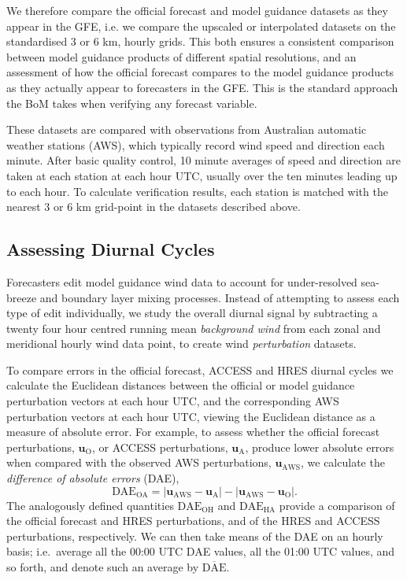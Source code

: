\documentclass[twocol]{ametsoc}
\begin{document}
We therefore compare the official forecast and model guidance datasets as they appear in the GFE, i.e. we compare the upscaled or interpolated datasets on the standardised 3 or 6 km, hourly grids. This both ensures a consistent comparison between model guidance products of different spatial resolutions, and an assessment of how the official forecast compares to the model guidance products as they actually appear to forecasters in the GFE. This is the standard approach the BoM takes when verifying any forecast variable.

These datasets are compared with observations from Australian automatic weather stations (AWS), which typically record wind speed and direction each minute. After basic quality control, 10 minute averages of speed and direction are taken at each station at each hour UTC, usually over the ten minutes leading up to each hour. To calculate verification results, each station is matched with the nearest 3 or 6 km grid-point in the datasets described above.

\subsection{Assessing Diurnal Cycles}
Forecasters edit model guidance wind data to account for under-resolved sea-breeze and boundary layer mixing processes. Instead of attempting to assess each type of edit individually, we study the overall diurnal signal by subtracting a twenty four hour centred running mean \textit{background wind} from each zonal and meridional hourly wind data point, to create wind \emph{perturbation} datasets.

To compare errors in the official forecast, ACCESS and HRES diurnal cycles we calculate the Euclidean distances between the official or model guidance perturbation vectors at each hour UTC, and the corresponding AWS perturbation vectors at each hour UTC, viewing the Euclidean distance as a measure of absolute error. For example, to assess whether the official forecast perturbations, $\boldsymbol{u}_{\text{O}}$, or ACCESS perturbations, $\boldsymbol{u}_{\text{A}}$, produce lower absolute errors when compared with the observed AWS perturbations, $\boldsymbol{u}_{\text{AWS}}$, we calculate the \textit{difference of absolute errors} (DAE), 
\begin{equation}
\text{DAE}_\text{OA} = \left\lvert \boldsymbol{u}_{\text{AWS}}-\boldsymbol{u}_{\text{A}} \right\rvert - \left\lvert \boldsymbol{u}_{\text{AWS}}-\boldsymbol{u}_{\text{O}} \right\rvert. \label{Eq:DAE}
\end{equation} 
The analogously defined quantities $\text{DAE}_\text{OH}$ and $\text{DAE}_\text{HA}$ provide a comparison of the official forecast and HRES perturbations, and of the HRES and ACCESS perturbations, respectively. We can then take means of the DAE on an hourly basis; i.e.~average all the 00:00 UTC DAE values,  all the 01:00 UTC values, and so forth, and denote such an average by $\overline{\text{DAE}}$. 
\end{document}
